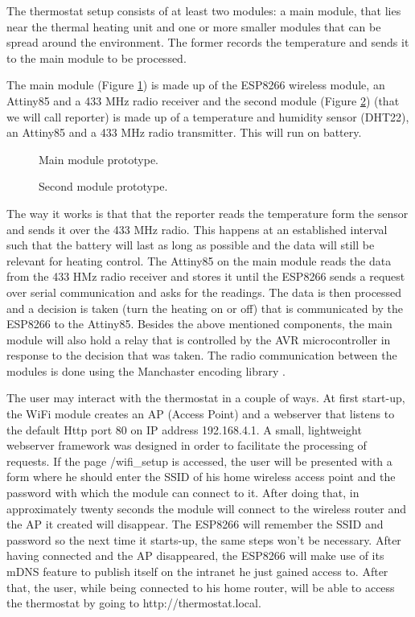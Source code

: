 \documentclass[conference]{IEEEtran}
\begin{document}
The thermostat setup consists of at least two modules: a main module, that lies near the thermal heating unit
and one or more smaller modules that can be spread around the environment. The former records the temperature
and sends it to the main module to be processed.

The main module (Figure \ref{fig:first_module}) is made up of the ESP8266 wireless module, an Attiny85 and a
433 MHz radio receiver and the second module (Figure \ref{fig:second_module}) (that we will call reporter) is
made up of a temperature and humidity sensor (DHT22), an Attiny85 and a 433 MHz radio transmitter. This will
run on battery.

\begin{figure}[h!]
\label{fig:first_module}
\centerline{}
      \caption[MainModule]{Main module prototype.}
\label{fig:first_module}
\end{figure}

\begin{figure}[h!]
\label{fig:nn}
\centerline{}
      \caption[MainModule]{Second module prototype.}
\label{fig:second_module}
\end{figure}

The way it works is that that the reporter reads the temperature form the sensor and sends it over the 433 MHz
radio. This happens at an established interval such that the battery will last as long as possible
and the data will still be relevant for heating control. The Attiny85 on the main module reads the data
from the 433 HMz radio receiver and stores it until the ESP8266 sends a request over serial communication and asks
for the readings. The data is then processed and a decision is taken (turn the heating on or off) that is
communicated by the ESP8266 to the Attiny85. Besides the above mentioned components, the main module will
also hold a relay that is controlled by the AVR microcontroller in response to the decision that was taken.
The radio communication between the modules is done using the Manchaster encoding library
\cite{website:manchester}.

The user may interact with the thermostat in a couple of ways.
At first start-up, the WiFi module creates an AP (Access Point) and a webserver that listens to the default Http port 80
on IP address 192.168.4.1. A small, lightweight webserver framework was designed in order to facilitate the
processing of requests.
If the page /wifi\_setup is accessed, the user will be presented with a form
where he should enter the SSID of his home wireless access point and the password with which the module
can connect to it. After doing that, in approximately twenty seconds the module will connect to the wireless
router and the AP it created will disappear. The ESP8266 will remember the SSID and password so the next time
it starts-up, the same steps won't be necessary.
After having connected and the AP disappeared, the ESP8266 will make use of its mDNS feature to publish itself
on the intranet he just gained access to. After that, the user, while being connected to his home router, will
be able to access the thermostat by going to http://thermostat.local.
\end{document}
